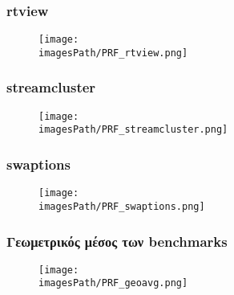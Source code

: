 \documentclass[12pt,a4paper]{article}
\newcommand{\imagesPath}{parsec-3.0/parsec_workspace/graphs}
\begin{document}
			\subsubsection{rtview}
				\begin{figure}[H]
					\begin{center}
						\texttt{[image: \\imagesPath/PRF\_rtview.png]}
					\end{center}
				\end{figure}
			
			\subsubsection{streamcluster}
				\begin{figure}[H]
					\begin{center}
						\texttt{[image: \\imagesPath/PRF\_streamcluster.png]}
					\end{center}
				\end{figure}
			
			\subsubsection{swaptions}
				\begin{figure}[H]
					\begin{center}
						\texttt{[image: \\imagesPath/PRF\_swaptions.png]}
					\end{center}
				\end{figure}
						
			\subsubsection{Γεωμετρικός μέσος των benchmarks}
				\begin{figure}[H]
					\begin{center}
						\texttt{[image: \\imagesPath/PRF\_geoavg.png]}
					\end{center}
				\end{figure}
\end{document}

